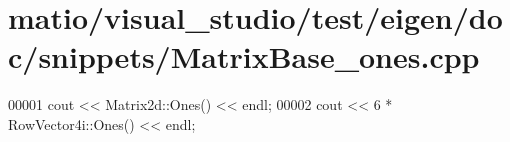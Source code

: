 \hypertarget{matio_2visual__studio_2test_2eigen_2doc_2snippets_2_matrix_base__ones_8cpp_source}{}\section{matio/visual\+\_\+studio/test/eigen/doc/snippets/\+Matrix\+Base\+\_\+ones.cpp}
\label{matio_2visual__studio_2test_2eigen_2doc_2snippets_2_matrix_base__ones_8cpp_source}

\begin{DoxyCode}
00001 cout << Matrix2d::Ones() << endl;
00002 cout << 6 * RowVector4i::Ones() << endl;
\end{DoxyCode}
